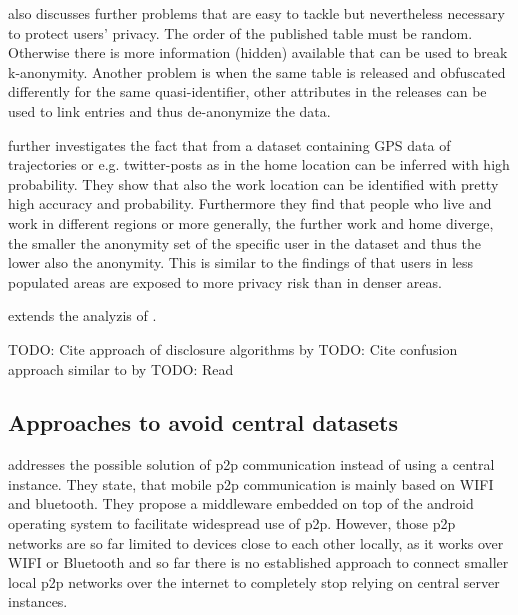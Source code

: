 \parencite{k-anonymity} also discusses further problems that are easy to tackle but nevertheless necessary to protect users' privacy. The order of the published table must be random. Otherwise there is more information (hidden) available that can be used to break k-anonymity. Another problem is when the same table is released and obfuscated differently for the same quasi-identifier, other attributes in the releases can be used to link entries and thus de-anonymize the data.

\parencite{privacy-home-work-pairs} further investigates the fact that from a dataset containing GPS data of trajectories or e.g. twitter-posts as in \parencite{twitter} the home location can be inferred with high probability. They show that also the work location can be identified with pretty high accuracy and probability. Furthermore they find that people who live and work in different regions or more generally, the further work and home diverge, the smaller the anonymity set of the specific user in the dataset and thus the lower also the anonymity. This is similar to the findings of \parencite{location-privacy} that users in less populated areas are exposed to more privacy risk than in denser areas.

\parencite{mix-zones} extends the analyzis of \parencite{location-privacy}.

TODO: Cite approach of disclosure algorithms by \parencite{gruteser2005anonymity}
TODO: Cite confusion approach similar to \parencite{time-to-confusion} by \parencite{hoh2005protecting}
TODO: Read \parencite{tang2006putting}

\subsection{Approaches to avoid central datasets}

\parencite{p2p-android} addresses the possible solution of p2p communication instead of using a central instance. They state, that mobile p2p communication is mainly based on WIFI and bluetooth. They propose a middleware embedded on top of the android operating system to facilitate widespread use of p2p. However, those p2p networks are so far limited to devices close to each other locally, as it works over WIFI or Bluetooth and so far there is no established approach to connect smaller local p2p networks over the internet to completely stop relying on central server instances.

